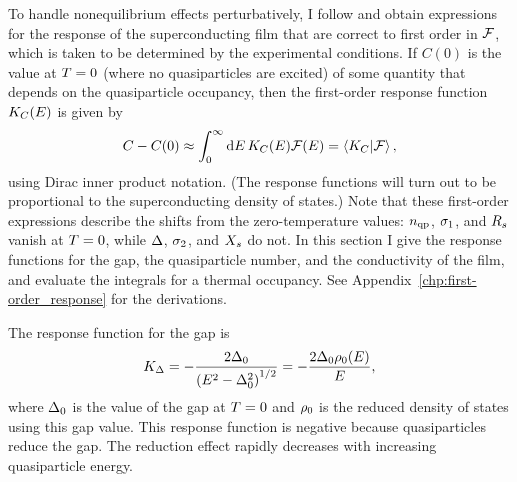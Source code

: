 To handle nonequilibrium effects perturbatively, I follow \textcite{Zmuidzinas2012ARCMP} and obtain expressions for the response of the superconducting film that are correct to first order in $\mathcal{F}$, which is taken to be determined by the experimental conditions.
If $C(0)$ is the value at $T = 0$ (where no quasiparticles are excited) of some quantity that depends on the quasiparticle occupancy, then the first-order response function $K_C(E)$ is given by
\begin{equation}
C - C(0)
  \approx
  \int_0^\infty \dd{E} K_C(E) \mathcal{F}(E)
  =
  \braket{K_C}{\mathcal{F}},
\end{equation}
using Dirac inner product notation.
(The response functions will turn out to be proportional to the superconducting density of states.)
Note that these first-order expressions describe the shifts from the zero-temperature values: $n_{\mathrm{qp}}$, $\sigma_1$, and $R_s$ vanish at $T = 0$, while $\Delta$, $\sigma_2$, and $X_s$ do not.
In this section I give the response functions for the gap, the quasiparticle number, and the conductivity of the film, and evaluate the integrals for a thermal occupancy.
See Appendix~\ref{chp:first-order_response} for the derivations.

The response function for the gap is
\begin{equation}
K_\Delta
  =
  - \frac{2 \Delta_0}{\left(E^2 - \Delta_0^2\right)^{1/2}}
  =
  - \frac{2 \Delta_0 \rho_0(E)}{E},
\end{equation}
where $\Delta_0$ is the value of the gap at $T = 0$ and $\rho_0$ is the reduced density of states using this gap value.
This response function is negative because quasiparticles reduce the gap.
The reduction effect rapidly decreases with increasing quasiparticle energy.

